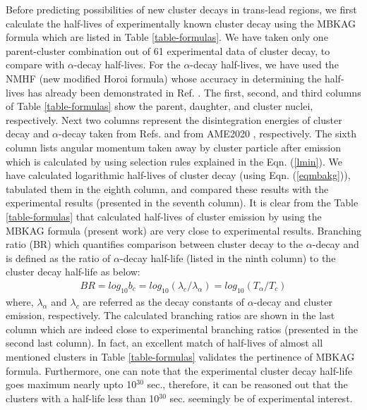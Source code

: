 \documentclass[preprint,10pt]{elsarticle}
\begin{document}
Before predicting possibilities of new cluster decays in trans-lead regions, we first calculate the half-lives of experimentally known cluster decay using the MBKAG formula which are listed in Table \ref{table-formulas}. We have taken only one parent-cluster combination out of 61 experimental data of cluster decay, to compare with $\alpha$-decay half-lives. For the $\alpha$-decay half-lives, we have used the NMHF (new modified Horoi formula) whose accuracy in determining the half-lives has already been demonstrated in Ref. \cite{pksharma2021}. The first, second, and third columns of Table \ref{table-formulas} show the parent, daughter, and cluster nuclei, respectively. Next two columns represent the disintegration energies of cluster decay and $\alpha$-decay taken from Refs. \cite{Bonetti2007,Price1989,Royer2001,Soylu2021} and from AME2020 \cite{audii20201}, respectively. The sixth column lists angular momentum taken away by cluster particle after emission which is calculated by using selection rules explained in the Eqn. (\ref{lmin}). We have calculated logarithmic half-lives of cluster decay (using Eqn. (\ref{eqmbakg})), tabulated them in the eighth column, and compared these results with the experimental results (presented in the seventh column). It is clear from the Table \ref{table-formulas} that calculated half-lives of cluster emission by using the MBKAG formula (present work) are very close to experimental results. Branching ratio (BR) which quantifies comparison between cluster decay to the $\alpha$-decay and is defined as the ratio of $\alpha$-decay half-life (listed in the ninth column) to the cluster decay half-life as below:
\begin{eqnarray}
 BR = log_{10}b_{c} = log_{10}(\lambda_{c}/\lambda_{\alpha}) = log_{10}(T_{\alpha}/T_{c})
 \label{eq}
 \end{eqnarray}
 where, $\lambda_{\alpha}$ and $\lambda_{c}$ are referred as the decay constants of $\alpha$-decay and cluster emission, respectively. The calculated branching ratios are shown in the last column which are indeed close to experimental branching ratios \cite{Bonetti2007,Price1989,Royer2001,Soylu2021} (presented in the second last column). In fact, an excellent match of half-lives of almost all mentioned clusters in Table \ref{table-formulas} validates the pertinence of MBKAG formula. Furthermore, one can note that the experimental cluster decay half-life goes maximum nearly upto 10$^{30}$ sec., therefore, it can be reasoned out that the clusters with a half-life less than 10$^{30}$ sec. seemingly be of experimental interest.\par
\end{document}
